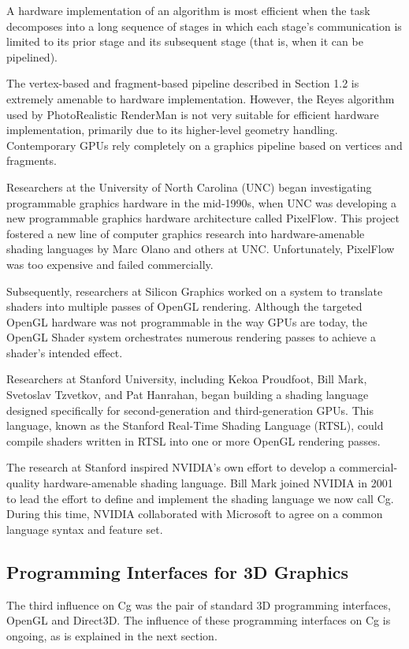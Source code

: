 \documentclass{book}
\begin{document}
A hardware implementation of an algorithm is most efficient when the task decomposes into a long sequence of stages in which each stage's communication is limited to its prior stage and its subsequent stage (that is, when it can be pipelined).

The vertex-based and fragment-based pipeline described in Section 1.2 is extremely amenable to hardware implementation. However, the Reyes algorithm used by PhotoRealistic RenderMan is not very suitable for efficient hardware implementation, primarily due to its higher-level geometry handling. Contemporary GPUs rely completely on a graphics pipeline based on vertices and fragments.

Researchers at the University of North Carolina (UNC) began investigating programmable graphics hardware in the mid-1990s, when UNC was developing a new programmable graphics hardware architecture called PixelFlow. This project fostered a new line of computer graphics research into hardware-amenable shading languages by Marc Olano and others at UNC. Unfortunately, PixelFlow was too expensive and failed commercially.

Subsequently, researchers at Silicon Graphics worked on a system to translate shaders into multiple passes of OpenGL rendering. Although the targeted OpenGL hardware was not programmable in the way GPUs are today, the OpenGL Shader system orchestrates numerous rendering passes to achieve a shader's intended effect.

Researchers at Stanford University, including Kekoa Proudfoot, Bill Mark, Svetoslav Tzvetkov, and Pat Hanrahan, began building a shading language designed specifically for second-generation and third-generation GPUs. This language, known as the Stanford Real-Time Shading Language (RTSL), could compile shaders written in RTSL into one or more OpenGL rendering passes.

The research at Stanford inspired NVIDIA's own effort to develop a commercial-quality hardware-amenable shading language. Bill Mark joined NVIDIA in 2001 to lead the effort to define and implement the shading language we now call Cg. During this time, NVIDIA collaborated with Microsoft to agree on a common language syntax and feature set.

\subsection{Programming Interfaces for 3D Graphics}

The third influence on Cg was the pair of standard 3D programming interfaces, OpenGL and Direct3D. The influence of these programming interfaces on Cg is ongoing, as is explained in the next section.
\end{document}
